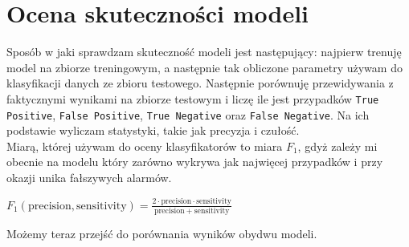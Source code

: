 \documentclass[polish,12pt,a4paper]{extarticle}
\begin{document}
\section*{Ocena skuteczności modeli}
Sposób w jaki sprawdzam skuteczność modeli jest następujący: najpierw trenuję model na zbiorze treningowym, a następnie tak obliczone parametry używam do klasyfikacji danych ze zbioru testowego. Następnie porównuję przewidywania z faktycznymi wynikami na zbiorze testowym i liczę ile jest przypadków \texttt{True Positive}, \texttt{False Positive}, \texttt{True Negative} oraz \texttt{False Negative}. Na ich podstawie wyliczam statystyki, takie jak precyzja i czułość. \smallskip \\
Miarą, której używam do oceny klasyfikatorów to miara $F_1$, gdyż zależy mi obecnie na modelu który zarówno wykrywa jak najwięcej przypadków i przy okazji unika fałszywych alarmów. \begin{center}
$F_1(\mathrm{precision}, \mathrm{sensitivity}) = \frac{2 \cdot \mathrm{precision} \cdot \mathrm{sensitivity}}{\mathrm{precision} + \mathrm{sensitivity}}$
\end{center}
Możemy teraz przejść do porównania wyników obydwu modeli.
\end{document}
